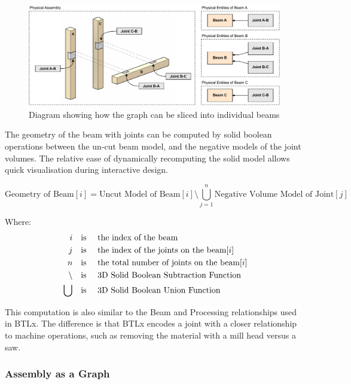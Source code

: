 \begin{figure}[!h]
    \centering
    \includegraphics[width=0.99\textwidth]{images/05/image73.pdf}
    \caption{Diagram showing how the graph can be sliced into individual beams}
    \label{fig:diagram-graph-can-be-sliced}
\end{figure}


The geometry of the beam with joints can be computed by solid boolean operations between the un-cut beam model, and the negative models of the joint volumes. The relative ease of dynamically recomputing the solid model allows quick visualisation during interactive design.

\begin{equation}
    \textrm{Geometry of Beam}[i] = \textrm{Uncut Model of Beam}[i] \setminus \bigcup_{j=1}^n  \textrm{Negative Volume Model of Joint}[j]
\end{equation}

Where: 
\begin{align*}
    i \quad &\textrm{is \quad the index of the beam}\\
    j \quad &\textrm{is \quad the index of the joints on the beam}[i]\\
    n \quad &\textrm{is \quad the total number of joints on the beam}[i]\\
    \setminus \quad &\textrm{is \quad 3D Solid Boolean Subtraction Function}\\
    \bigcup \quad &\textrm{is \quad 3D Solid Boolean Union Function}
\end{align*}

This computation is also similar to the Beam and Processing relationships used in BTLx. The difference is that BTLx encodes a joint with a closer relationship to machine operations, such as removing the material with a mill head versus a saw.

\subsubsection{Assembly as a Graph}
\label{subsubsection:exploration-2-assembly-as-a-graph}

